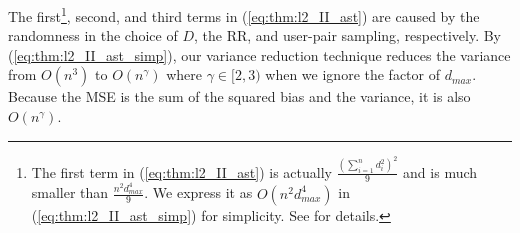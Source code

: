 %

The first\footnote{The first term in (\ref{eq:thm:l2_II_ast}) is actually $\frac{(\sum_{i=1}^n d_i^2)^2}{9}$ and is much smaller than $\frac{n^2 d_{max}^4}{9}$. 
We express it as $O(n^2 d_{max}^4)$ in (\ref{eq:thm:l2_II_ast_simp}) for simplicity. 
See  for details.}, second, and third terms in (\ref{eq:thm:l2_II_ast}) are caused by the randomness in the choice of $D$, the RR, and user-pair sampling, respectively. 
By (\ref{eq:thm:l2_II_ast_simp}), our variance reduction technique reduces the variance from $O(n^3)$ to $O(n^\gamma)$ where $\gamma\in[2,3)$ when we ignore the factor of $d_{max}$.
Because the MSE is the sum of the squared bias and the variance, it is also $O(n^\gamma)$.

